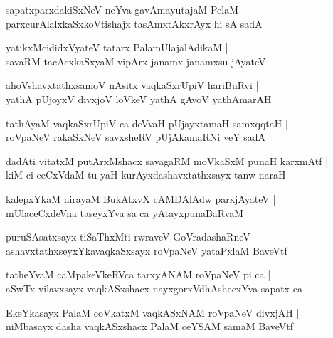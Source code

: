 \documentclass[twoside,12pt,openright]{book}
\newcounter{shloka}[chapter]
\begin{document}
\begin{shloka}%
sapatxparxdakiSxNeV neYva gavAmayutajaM PelaM |\\
parxcurAlalxkaSxkoVtishajx tasAmxtAkxrAyx hi sA sadA
\end{shloka}

\begin{shloka}%
yatikxMcididxVyateV tatarx PalamUlajalAdikaM |\\
savaRM tacAcxkaSxyaM vipArx janamx janamxsu jAyateV
\end{shloka}

\begin{shloka}%
ahoVshavxtathxsamoV nAsitx vaqkaSxrUpiV hariBuRvi |\\
yathA pUjoyxV divxjoV loVkeV yathA gAvoV yathAmarAH 
\end{shloka}

\begin{shloka}%
tathAyaM vaqkaSxrUpiV ca deVvaH pUjayxtamaH samxqqtaH |\\
roVpaNeV rakaSxNeV savxsheRV pUjAkamaRNi veY sadA 
\end{shloka}

\begin{shloka}%
dadAti vitatxM putArxMshacx savagaRM moVkaSxM punaH karxmAtf |\\
kiM ci ceCxVdaM tu yaH kurAyxdashavxtathxsayx tanw naraH 
\end{shloka}

\begin{shloka}%
kalepxYkaM nirayaM BukAtxvX cAMDAlAdw parxjAyateV |\\
mUlaceCxdeVna taseyxYva sa ca yAtayxpunaBaRvaM 
\end{shloka}

\begin{shloka}%
puruSAsatxsayx tiSaThxMti rwraveV GoVradashaRneV |\\
ashavxtathxseyxYkavaqkaSxsayx roVpaNeV yataPxlaM BaveVtf
\end{shloka}

\begin{shloka}%
tatheYvaM caMpakeVkeRVca tarxyANAM roVpaNeV pi ca |\\
aSwTx vilavxsayx vaqkASxshacx nayxgorxVdhAshecxYva sapatx ca 
\end{shloka}

\begin{shloka}%
EkeYkasayx PalaM coVkatxM vaqkASxNAM roVpaNeV divxjAH |\\
niMbasayx dasha vaqkASxshacx PalaM ceYSAM samaM BaveVtf
\end{shloka}
\end{document}
